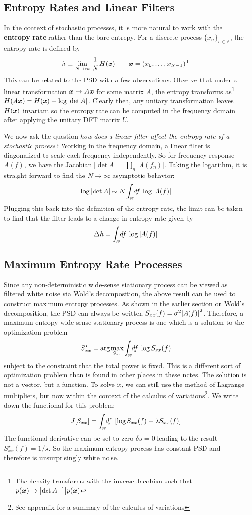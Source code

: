 \documentclass[twocolumn]{gwclass}
\newcommand{\Z}{\mathbb{Z}}
\newcommand{\intbw}[1]{\int_{\hspace{-0.1em}\scriptscriptstyle\mathscr{B}}\hspace{-0.25em}}
\begin{document}
\subsection{Entropy Rates and Linear Filters}
In the context of stochastic processes, it is more natural to work with the \textbf{entropy rate} rather than the bare entropy. For a discrete process $\{x_n\}_{n\in\Z}$, the entropy rate is defined by
$$ h \equiv \lim_{N\to\infty} \frac{1}{N}H(\boldsymbol{x})\qquad \boldsymbol{x}=(x_0,\dots,x_{N-1})^{\text{\normalfont{T}}} $$
This can be related to the PSD with a few observations. Observe that under a linear transformation $\boldsymbol{x}\mapsto A\boldsymbol{x}$ for some matrix $A$, the entropy transforms as\footnote{The density transforms with the inverse Jacobian such that $p(\boldsymbol{x})\mapsto \abs{\det A^{-1}}p(\boldsymbol{x})$} $H(A\boldsymbol{x})=H(\boldsymbol{x}) + \log \abs{\det A}$. Clearly then, any unitary transformation leaves $H(\boldsymbol{x})$ invariant so the entropy rate can be computed in the frequency domain after applying the unitary DFT matrix $U$.

We now ask the question \emph{how does a linear filter affect the entropy rate of a stochastic process?} Working in the frequency domain, a linear filter is diagonalized to scale each frequency independently. So for frequency response $A(f)$, we have the Jacobian $ |\det A| = \prod_n |A(f_n)| $. Taking the logarithm, it is straight forward to find the $N\to \infty$ asymptotic behavior:
$$ \log\abs{\det A} \sim  N \intbw{1}  df\;\log|A(f)| $$ 
Plugging this back into the definition of the entropy rate, the limit can be taken to find that the filter leads to a change in entropy rate given by
$$ \Delta h = \intbw{1} df\;\log|A(f)| $$
\subsection{Maximum Entropy Rate Processes}
Since any non-deterministic wide-sense stationary process can be viewed as filtered white noise via Wold's decomposition, the above result can be used to construct maximum entropy processes. As shown in the earlier section on Wold's decomposition, the PSD can always be written $S_{xx}(f)=\sigma^2 \abs{A(f)}^2$. Therefore, a maximum entropy wide-sense stationary process is one which is a solution to the optimization problem
$$ S_{xx}^{\star} = \arg\max_{S_{xx}}\intbw{1} df\;\log S_{xx}(f) $$
subject to the constraint that the total power is fixed. This is a different sort of optimization problem than is found in other places in these notes. The solution is not a vector, but a function. To solve it, we can still use the method of Lagrange multipliers, but now within the context of the calculus of variations\footnote{See appendix for a summary of the calculus of variations}. We write down the functional for this problem:
$$ J[S_{xx}] = \intbw{1} df\;\left[ \log S_{xx}(f) - \lambda S_{xx}(f)\right] $$
The functional derivative can be set to zero $\delta J=0$ leading to the result $S^\star_{xx}(f) = 1/\lambda$. So the maximum entropy process has constant PSD and therefore is unsurprisingly white noise.
\end{document}
